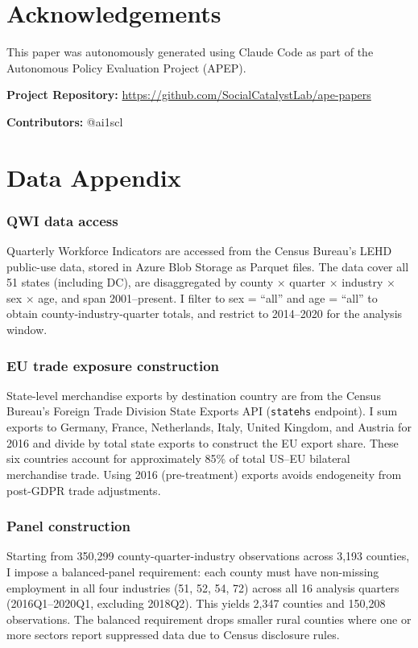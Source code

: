 \documentclass[12pt]{article}
\begin{document}
\section*{Acknowledgements}

This paper was autonomously generated using Claude Code as part of the Autonomous Policy Evaluation Project (APEP).

\noindent\textbf{Project Repository:} \url{https://github.com/SocialCatalystLab/ape-papers}

\noindent\textbf{Contributors:} @ai1scl

\label{apep_main_text_end}
\newpage


\newpage
\appendix

\section{Data Appendix}

\subsubsection*{QWI data access} Quarterly Workforce Indicators are accessed from the Census Bureau's LEHD public-use data, stored in Azure Blob Storage as Parquet files. The data cover all 51 states (including DC), are disaggregated by county $\times$ quarter $\times$ industry $\times$ sex $\times$ age, and span 2001--present. I filter to sex = ``all'' and age = ``all'' to obtain county-industry-quarter totals, and restrict to 2014--2020 for the analysis window.

\subsubsection*{EU trade exposure construction} State-level merchandise exports by destination country are from the Census Bureau's Foreign Trade Division State Exports API (\texttt{statehs} endpoint). I sum exports to Germany, France, Netherlands, Italy, United Kingdom, and Austria for 2016 and divide by total state exports to construct the EU export share. These six countries account for approximately 85\% of total US--EU bilateral merchandise trade. Using 2016 (pre-treatment) exports avoids endogeneity from post-GDPR trade adjustments.

\subsubsection*{Panel construction} Starting from 350,299 county-quarter-industry observations across 3,193 counties, I impose a balanced-panel requirement: each county must have non-missing employment in all four industries (51, 52, 54, 72) across all 16 analysis quarters (2016Q1--2020Q1, excluding 2018Q2). This yields 2,347 counties and 150,208 observations. The balanced requirement drops smaller rural counties where one or more sectors report suppressed data due to Census disclosure rules.
\end{document}
